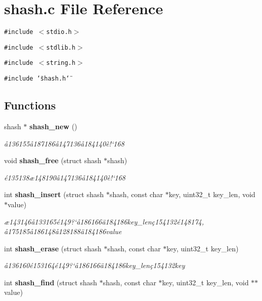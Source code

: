 \section{shash.c File Reference}
\label{shash_8c}
{\tt \#include $<$stdio.h$>$}\par
{\tt \#include $<$stdlib.h$>$}\par
{\tt \#include $<$string.h$>$}\par
{\tt \#include \char`\"{}shash.h\char`\"{}}\par
\subsection*{Functions}
\begin{CompactItemize}
\item 
shash $\ast$ {\bf shash\_\-new} ()
\begin{CompactList}\small\item\em \aa{}136155\aa{}187186\aa{}147136\aa{}184140\`{e}!`168 \item\end{CompactList}\item 
void {\bf shash\_\-free} (struct shash $\ast$shash)
\begin{CompactList}\small\item\em \'{e}135138\ae{}148190\aa{}147136\aa{}184140\`{e}!`168 \item\end{CompactList}\item 
int {\bf shash\_\-insert} (struct shash $\ast$shash, const char $\ast$key, uint32\_\-t key\_\-len, void $\ast$value)
\begin{CompactList}\small\item\em \ae{}143146\aa{}133165\'{e}149?`\aa{}186166\"{a}184186key\_\-len\c{c}154132\'{e}148174, \aa{}175185\aa{}186148\aa{}128188\"{a}184186value \item\end{CompactList}\item 
int {\bf shash\_\-erase} (struct shash $\ast$shash, const char $\ast$key, uint32\_\-t key\_\-len)
\begin{CompactList}\small\item\em \aa{}136160\'{e}153164\'{e}149?`\aa{}186166\"{a}184186key\_\-len\c{c}154132key \item\end{CompactList}\item 
int {\bf shash\_\-find} (struct shash $\ast$shash, const char $\ast$key, uint32\_\-t key\_\-len, void $\ast$$\ast$value)
$$
\end{CompactItemize}
